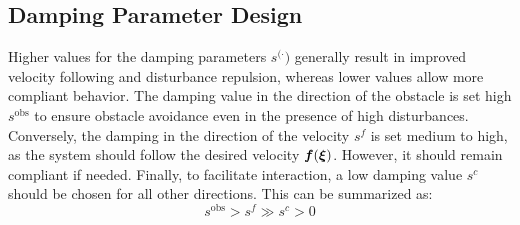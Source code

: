 \subsection{Damping Parameter Design}
Higher values for the damping parameters $s^{(\cdot})$ generally result in improved velocity following and disturbance repulsion, whereas lower values allow more compliant behavior.
The damping value in the direction of the obstacle is set high $s^{\mathrm{obs}}$ to ensure obstacle avoidance even in the presence of high disturbances. 
Conversely, the damping in the direction of the velocity $s^{f}$ is set medium to high, as the system should follow the desired velocity $\boldsymbol{f}(\boldsymbol{\xi})$. However, it should remain compliant if needed.
Finally, to facilitate interaction, a low damping value $s^{c}$ should be chosen for all other directions.
This can be summarized as:
\begin{equation}
s^{\mathrm{obs}} > s^{f} \gg s^{c} > 0
\end{equation}
